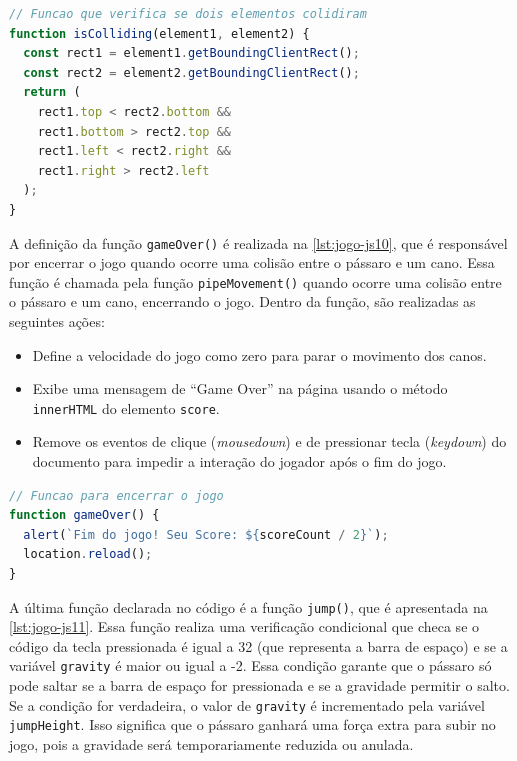 \begin{lstlisting}[language=TypeScript, caption={Projeto exemplo em JS (Parte 9): Função de verificação de colisão}, label=lst:jogo-js9]
// Funcao que verifica se dois elementos colidiram
function isColliding(element1, element2) {
  const rect1 = element1.getBoundingClientRect();
  const rect2 = element2.getBoundingClientRect();
  return (
    rect1.top < rect2.bottom &&
    rect1.bottom > rect2.top &&
    rect1.left < rect2.right &&
    rect1.right > rect2.left
  );
}
\end{lstlisting}


A definição da função \texttt{gameOver()} é realizada na \autoref{lst:jogo-js10}, que é responsável por encerrar o jogo quando ocorre uma colisão entre o pássaro e um cano. Essa função é chamada pela função \texttt{pipeMovement()} quando ocorre uma colisão entre o pássaro e um cano, encerrando o jogo. Dentro da função, são realizadas as seguintes ações:
\begin{itemize}
    \item Define a velocidade do jogo como zero para parar o movimento dos canos.

    \item Exibe uma mensagem de ``Game Over'' na página usando o método \texttt{innerHTML} do elemento \texttt{score}.

    \item Remove os eventos de clique (\textit{mousedown}) e de pressionar tecla (\textit{keydown}) do documento para impedir a interação do jogador após o fim do jogo.
\end{itemize}



\begin{lstlisting}[language=TypeScript, caption={Projeto exemplo em JS (Parte 10): Função de fim de jogo}, label=lst:jogo-js10]
// Funcao para encerrar o jogo
function gameOver() {
  alert(`Fim do jogo! Seu Score: ${scoreCount / 2}`);
  location.reload();
}
\end{lstlisting}

A última função declarada no código é a função \texttt{jump()}, que é apresentada na \autoref{lst:jogo-js11}. Essa função realiza uma verificação condicional que checa se o código da tecla pressionada é igual a 32 (que representa a barra de espaço) e se a variável \texttt{gravity} é maior ou igual a -2. Essa condição garante que o pássaro só pode saltar se a barra de espaço for pressionada e se a gravidade permitir o salto. Se a condição for verdadeira, o valor de \texttt{gravity} é incrementado pela variável \texttt{jumpHeight}. Isso significa que o pássaro ganhará uma força extra para subir no jogo, pois a gravidade será temporariamente reduzida ou anulada.

